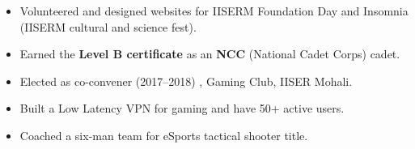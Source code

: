 




\begin{itemize}
    \item[\circ] Volunteered and designed websites for IISERM Foundation Day and Insomnia (IISERM cultural and science fest).
    \item[\circ] Earned the \textbf{Level B certificate} as an \textbf{NCC} (National Cadet Corps) cadet. 
    \item[\circ] Elected as co-convener (2017–2018) , Gaming Club, IISER Mohali.
    \item[\circ] Built a Low Latency VPN for gaming and have 50+ active users. 
    \item[\circ] Coached a six-man team for eSports tactical shooter title.
    
    
  \end{itemize}